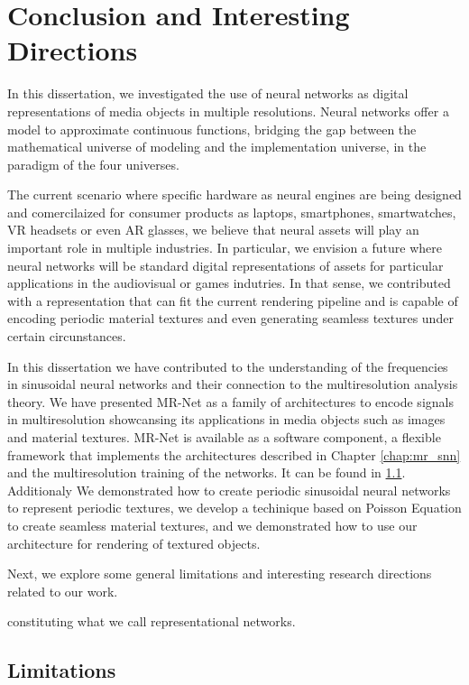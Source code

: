 \chapter{Conclusion and Interesting Directions}
\label{chap:future}

In this dissertation, we investigated the use of neural networks as digital representations of media objects in multiple resolutions. Neural networks offer a model to approximate continuous functions, bridging the gap between the mathematical universe of modeling and the implementation universe, in the paradigm of the four universes. 

The current scenario where specific hardware as neural engines are being designed and comercilaized for consumer products as laptops, smartphones, smartwatches, VR headsets or even AR glasses, we believe that neural assets will play an important role in multiple industries.  In particular, we envision a future where neural networks will be standard digital representations of assets for particular applications in the audiovisual or games indutries. In that sense, we contributed with a representation that can fit the current rendering pipeline and is capable of encoding periodic material textures and even generating seamless textures under certain circunstances.


In this dissertation we have contributed to the understanding of the frequencies in sinusoidal neural networks and their connection to the multiresolution analysis theory. We have presented MR-Net as a family of architectures to encode signals in multiresolution showcansing its applications in media objects such as images and material textures. MR-Net is available as a software component, a flexible framework that implements the architectures described in Chapter \ref{chap:mr_snn} and the multiresolution training of the networks. It can be found in \ref{}. Additionaly We demonstrated how to create periodic sinusoidal neural networks to represent periodic textures, we develop a techinique based on Poisson Equation to create seamless material textures, and we demonstrated how to use our architecture for rendering of textured objects.

Next, we explore some general limitations and interesting research directions related to our work.

constituting what we call representational networks.

\section{Limitations}

